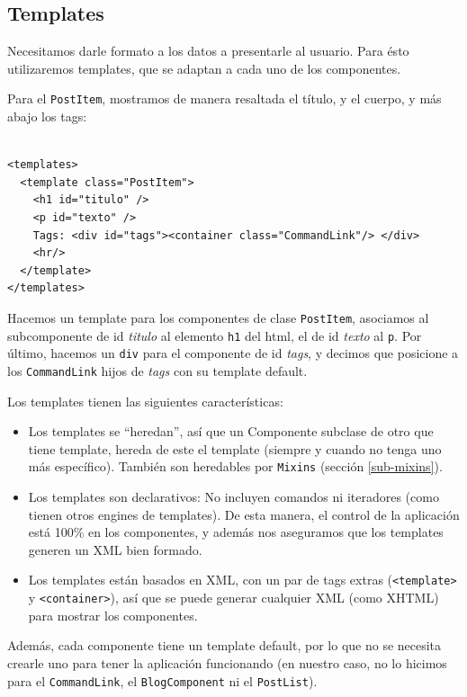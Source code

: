 \label{sec-view}
\subsection{Templates}
\label{sub-templates}

Necesitamos darle formato a los datos a presentarle al usuario. Para ésto utilizaremos templates, que se adaptan a cada uno de los componentes.

Para el \verb'PostItem', mostramos de manera resaltada el título, y el cuerpo, y más abajo los tags:

\begin{verbatim}

<templates>
  <template class="PostItem">
    <h1 id="titulo" />
    <p id="texto" />
    Tags: <div id="tags"><container class="CommandLink"/> </div>
    <hr/>
  </template>
</templates>

\end{verbatim}

Hacemos un template para los componentes de clase \verb'PostItem', asociamos al subcomponente de id \emph{titulo} al elemento \verb'h1' del html, el de id \emph{texto} al \verb'p'. Por último, hacemos un \verb'div' para el componente de id \emph{tags}, y decimos que posicione a los \verb'CommandLink' hijos de \emph{tags} con su template default.

Los templates tienen las siguientes características:
\begin{itemize}
\item Los templates se ``heredan'', así que un Componente subclase de otro que tiene template, hereda de este el template (siempre y cuando no tenga uno más específico).
También son heredables por \verb"Mixins" (sección \ref{sub-mixins}).

\item Los templates son declarativos: No incluyen comandos ni iteradores (como tienen otros engines de templates). De esta manera, el control de la aplicación está 100\% en los componentes, y además nos aseguramos que los templates generen un XML bien formado.

\item Los templates están basados en XML, con un par de tags extras (\verb"<template>" y \verb"<container>"), así que se puede generar cualquier XML (como XHTML) para mostrar los componentes.
\end{itemize}

Además, cada componente tiene un template default, por lo que no se necesita crearle uno para tener la aplicación funcionando (en nuestro caso, no lo hicimos para el \verb'CommandLink', el \verb"BlogComponent" ni el \verb"PostList").

